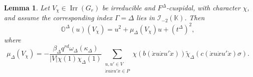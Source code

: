 \documentclass[12pt]{amsart}
\numberwithin{itemcounter}{subsection}
\theoremstyle{plain}
\newtheorem{lemma}[theorem]{Lemma}
\theoremstyle{definition}
\theoremstyle{remark}
\numberwithin{equation}{section}
\def\bbK{\mathbb{K}}
\def\bbO{\mathbb{O}}
\def\calI{\mathcal{I}}
\def\Irr{{\operatorname{Irr}\nolimits}}
\begin{document}
\begin{lemma}\label{Lem:Key}
Let $V_\chi\in\Irr(G_r)$ be irreducible and $F^\Delta$-cuspidal, with
character $\chi$, and assume the corresponding index $\Gamma=\Delta$ lies in $\calI_{-2}(\bbK)$.  Then
\begin{equation*}
\bbO^\Delta(u)(V_\chi)
=u^2+\mu_\Delta(V_\chi)u+(t^\Delta)^2,
\end{equation*}
where
\begin{equation}\label{eq:mu-exact}
\mu_\Delta(V_\chi)
=-\frac{\beta_\Delta q^{rd}\omega_\Delta(\kappa_\Delta)}
{|V|\chi(1)\chi_\Delta(1)}
\sum_{\substack{u,u'\in V\\
\dot{x}u\dot{x}u'\dot{x}\in P}}
\chi\!\left(b(\dot{x}u\dot{x}u'\dot{x})\right)
\widetilde\chi_\Delta\!\left(
 c(\dot{x}u\dot{x}u'\dot{x})\sigma\right).
\end{equation}
\end{lemma}
\end{document}
